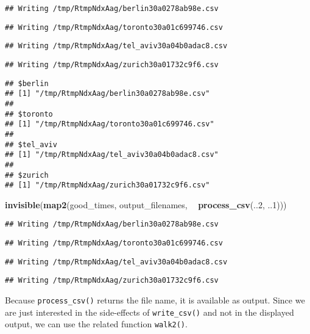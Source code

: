 \documentclass[]{book}
\newenvironment{Shaded}{\begin{snugshade}}{\end{snugshade}}
\newcommand{\DecValTok}[1]{\textcolor[rgb]{0.00,0.00,0.81}{#1}}
\newcommand{\KeywordTok}[1]{\textcolor[rgb]{0.13,0.29,0.53}{\textbf{#1}}}
\newcommand{\NormalTok}[1]{#1}
\newcommand{\OperatorTok}[1]{\textcolor[rgb]{0.81,0.36,0.00}{\textbf{#1}}}
\newcommand{\StringTok}[1]{\textcolor[rgb]{0.31,0.60,0.02}{#1}}
\begin{document}
\begin{verbatim}
## Writing /tmp/RtmpNdxAag/berlin30a0278ab98e.csv
\end{verbatim}

\begin{verbatim}
## Writing /tmp/RtmpNdxAag/toronto30a01c699746.csv
\end{verbatim}

\begin{verbatim}
## Writing /tmp/RtmpNdxAag/tel_aviv30a04b0adac8.csv
\end{verbatim}

\begin{verbatim}
## Writing /tmp/RtmpNdxAag/zurich30a01732c9f6.csv
\end{verbatim}

\begin{verbatim}
## $berlin
## [1] "/tmp/RtmpNdxAag/berlin30a0278ab98e.csv"
## 
## $toronto
## [1] "/tmp/RtmpNdxAag/toronto30a01c699746.csv"
## 
## $tel_aviv
## [1] "/tmp/RtmpNdxAag/tel_aviv30a04b0adac8.csv"
## 
## $zurich
## [1] "/tmp/RtmpNdxAag/zurich30a01732c9f6.csv"
\end{verbatim}

\begin{Shaded}
\begin{Highlighting}[]
\KeywordTok{invisible}\NormalTok{(}\KeywordTok{map2}\NormalTok{(good_times, output_filenames, }\OperatorTok{~}\StringTok{ }\KeywordTok{process_csv}\NormalTok{(..}\DecValTok{2}\NormalTok{, ..}\DecValTok{1}\NormalTok{)))}
\end{Highlighting}
\end{Shaded}

\begin{verbatim}
## Writing /tmp/RtmpNdxAag/berlin30a0278ab98e.csv
\end{verbatim}

\begin{verbatim}
## Writing /tmp/RtmpNdxAag/toronto30a01c699746.csv
\end{verbatim}

\begin{verbatim}
## Writing /tmp/RtmpNdxAag/tel_aviv30a04b0adac8.csv
\end{verbatim}

\begin{verbatim}
## Writing /tmp/RtmpNdxAag/zurich30a01732c9f6.csv
\end{verbatim}

Because \texttt{process\_csv()} returns the file name, it is available as output.
Since we are just interested in the side-effects of \texttt{write\_csv()} and not in the displayed output, we can use the related function \texttt{walk2()}.
\end{document}
